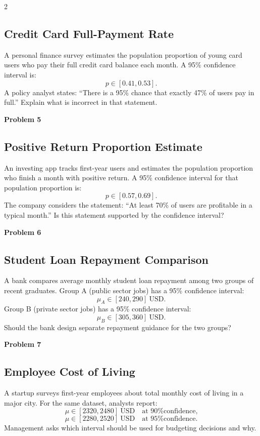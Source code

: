 \documentclass[12pt]{article}
\newcommand{\SubsectionBox}[1]{%
	\noindent\colorbox{gray!30}{\parbox{\linewidth}{\textbf{#1}}}\par\vspace{0.35cm}%
}
\begin{document}
\begin{multicols}{2}
		\subsection*{Credit Card Full-Payment Rate}
		A personal finance survey estimates the population proportion of young card users who pay their full credit card balance each month.
		A 95\% confidence interval is:
		\[
		p \in [0.41, 0.53].
		\]
		A policy analyst states: ``There is a 95\% chance that exactly 47\% of users pay in full.''
		Explain what is incorrect in that statement.
		
		\vspace{0.5cm}
		\SubsectionBox{Problem 5}
		\subsection*{Positive Return Proportion Estimate}
		An investing app tracks first-year users and estimates the population proportion who finish a month with positive return.
		A 95\% confidence interval for that population proportion is:
		\[
		p \in [0.57, 0.69].
		\]
		The company considers the statement: ``At least 70\% of users are profitable in a typical month.''
		Is this statement supported by the confidence interval?
		
		\vspace{0.5cm}
		\SubsectionBox{Problem 6}
		\subsection*{Student Loan Repayment Comparison}
		A bank compares average monthly student loan repayment among two groups of recent graduates.
		Group A (public sector jobs) has a 95\% confidence interval:
		\[
		\mu_A \in [240, 290]\ \text{USD}.
		\]
		Group B (private sector jobs) has a 95\% confidence interval:
		\[
		\mu_B \in [305, 360]\ \text{USD}.
		\]
		Should the bank design separate repayment guidance for the two groups?
		
		\vspace{0.5cm}
		\SubsectionBox{Problem 7}
		\subsection*{Employee Cost of Living}
		A startup surveys first-year employees about total monthly cost of living in a major city.
		For the same dataset, analysts report:
		\[
		\mu \in [2320, 2480]\ \text{USD} \quad \text{at 90\% confidence,}
		\]
		\[
		\mu \in [2280, 2520]\ \text{USD} \quad \text{at 95\% confidence.}
		\]
		Management asks which interval should be used for budgeting decisions and why.
		

\end{multicols}
\end{document}
